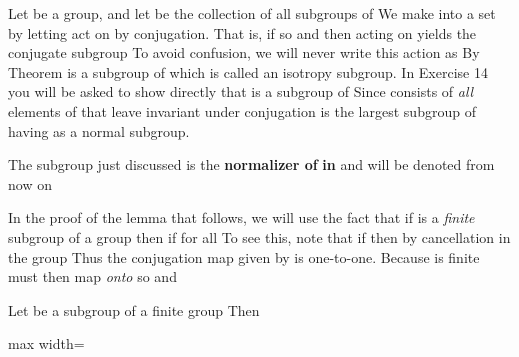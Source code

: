 \documentclass[11pt,oneside]{article}
\begin{document}
\BookNarrativetrue

\begin{BookBody}


\noindent Let  be a group, and let  be the collection of all subgroups of  We make  into a set by letting  act on  by conjugation. That is, if  so  and  then  acting on  yields the conjugate subgroup To avoid confusion, we will never write this action as  By Theorem  is a subgroup of  which is called an isotropy subgroup. In Exercise 14 you will be asked to show directly that  is a subgroup of  Since  consists of\textit{ all} elements of  that leave  invariant under conjugation is the largest subgroup of  having  as a normal subgroup.

 The subgroup  just discussed is the\textbf{ normalizer of}  \textbf{in}  and will be denoted  from now on\BookEnd{\blacksquare}

In the proof of the lemma that follows, we will use the fact that if  is a\textit{ finite} subgroup of a group  then  if  for all  To see this, note that if  then  by cancellation in the group  Thus the conjugation map  given by  is one-to-one. Because  is finite must then map  \textit{onto}  so  and 

 Let  be a subgroup of a finite group  Then

\begin{center}\begin{adjustbox}{max width=\linewidth}\end{adjustbox}\end{center}


\end{BookBody}
\end{document}
